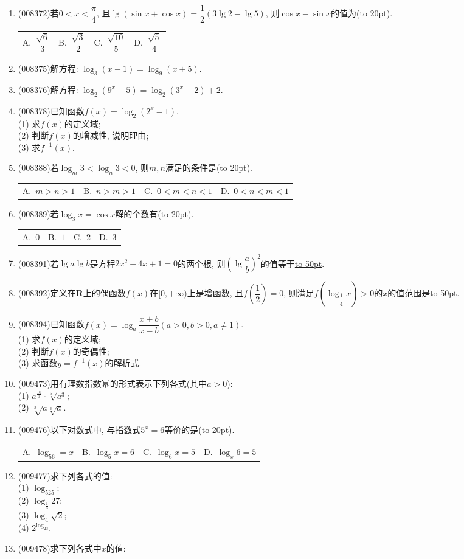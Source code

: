 \documentclass[10pt,a4paper]{article}
\newcommand{\blank}[1]{\underline{\hbox to #1pt{}}}
\newcommand{\bracket}[1]{(\hbox to #1pt{})}
\newcommand{\fourch}[4]{\par\begin{tabular}{p{.23\textwidth}p{.23\textwidth}p{.23\textwidth}p{.23\textwidth}}
A.~#1 &B.~#2& C.~#3& D.~#4
\end{tabular}}
\begin{document}
\begin{enumerate}[1.]
\item {\tiny (008372)}若$0<x<\dfrac{\pi}4$, 且$\lg (\sin x+\cos x)=\dfrac 12(3\lg 2-\lg 5)$, 则$\cos x-\sin x$的值为\bracket{20}.
\fourch{$\dfrac{\sqrt 6}3$}{$\dfrac{\sqrt 3}2$}{$\dfrac{\sqrt {10}}5$}{$\dfrac{\sqrt 5}4$}
\item {\tiny (008375)}解方程: $\log _3(x-1)=\log _9(x+5)$.
\item {\tiny (008376)}解方程: $\log _2(9^x-5)=\log _2(3^x-2)+2$.
\item {\tiny (008378)}已知函数$f(x)=\log _2(2^x-1)$.\\
(1) 求$f(x)$的定义域;\\
(2) 判断$f(x)$的增减性, 说明理由;\\
(3) 求$f^{-1}(x)$.
\item {\tiny (008388)}若$\log_m 3<\log_n 3<0$, 则$m,n$满足的条件是\bracket{20}.
\fourch{$m>n>1$}{$n>m>1$}{$0<m<n<1$}{$0<n<m<1$}
\item {\tiny (008389)}若$\log _3x=\cos x$解的个数有\bracket{20}.
\fourch{$0$}{$1$}{$2$}{$3$}
\item {\tiny (008391)}若$\lg a\lg b$是方程$2x^2-4x+1=0$的两个根, 则$(\lg \dfrac ab)^2$的值等于\blank{50}.
\item {\tiny (008392)}定义在$\mathbf{R}$上的偶函数$f(x)$在$[0,+\infty)$上是增函数, 且$f(\dfrac 12)=0$, 则满足$f(\log _{\dfrac 14}x)>0$的$x$的值范围是\blank{50}.
\item {\tiny (008394)}已知函数$f(x)=\log _a\dfrac{x+b}{x-b}(a>0,b>0, a\ne 1)$.\\
(1) 求$f(x)$的定义域;\\
(2) 判断$f(x)$的奇偶性;\\
(3) 求函数$y=f^{-1}(x)$的解析式.
\item {\tiny (009473)}用有理数指数幂的形式表示下列各式(其中$a>0$):\\
(1) $a^{\frac{10}3}\cdot \sqrt[5]{a^3}$;\\
(2) $\sqrt[3]{a\sqrt[3]{a}}$.
\item {\tiny (009476)}以下对数式中, 与指数式$5^x=6$等价的是\bracket{20}.
\fourch{$\log_56=x$}{$\log_5x=6$}{$\log_6x=5$}{$\log_x6=5$}
\item {\tiny (009477)}求下列各式的值:\\
(1) $\log_525$;\\
(2) $\log_{\frac 13}27$;\\
(3) $\log_4\sqrt 2$;\\
(4) $2^{\log_23}$.
\item {\tiny (009478)}求下列各式中$x$的值:\\

\end{enumerate}
\end{document}
